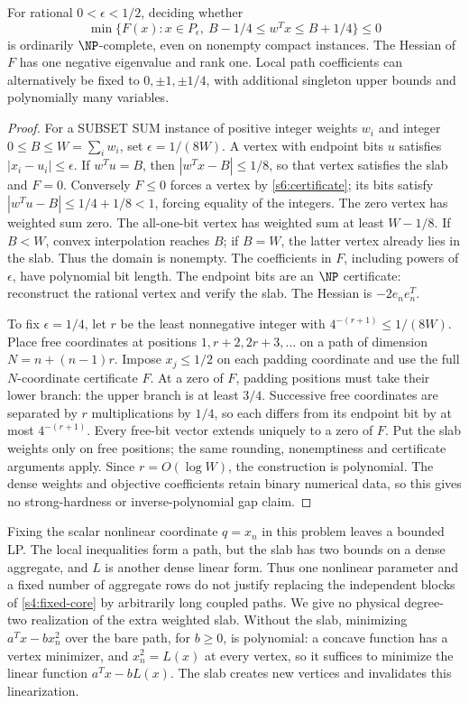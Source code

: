 \begin{proposition}\label{s6:slab-hardness}
For rational $0<\epsilon<1/2$, deciding whether
\[
 \min\{F(x):x\in P_\epsilon,\ B-1/4\le w^Tx\le B+1/4\}\le0
\]
is ordinarily $\NP$-complete, even on nonempty compact instances.
The Hessian of $F$ has one negative eigenvalue and rank one. Local
path coefficients can alternatively be fixed to $0,\pm1,\pm1/4$,
with additional singleton upper bounds and polynomially many variables.
\end{proposition}
\begin{proof}
For a SUBSET SUM instance of positive integer weights $w_i$ and integer
$0\le B\le W=\sum_iw_i$, set $\epsilon=1/(8W)$. A vertex with
endpoint bits $u$ satisfies $|x_i-u_i|\le\epsilon$.
If $w^Tu=B$, then $|w^Tx-B|\le1/8$, so that vertex satisfies the
slab and $F=0$. Conversely $F\le0$ forces a vertex by
\cref{s6:certificate}; its bits satisfy
$|w^Tu-B|\le1/4+1/8<1$, forcing equality of the integers.
The zero vertex has weighted sum zero. The all-one-bit vertex has
weighted sum at least $W-1/8$. If $B<W$, convex interpolation reaches
$B$; if $B=W$, the latter vertex already lies in the slab.
Thus the domain is nonempty. The coefficients in $F$, including powers
of $\epsilon$, have polynomial bit length. The endpoint bits are an
$\NP$ certificate: reconstruct the rational vertex and verify the slab.
The Hessian is $-2e_ne_n^T$.

To fix $\epsilon=1/4$, let $r$ be the least nonnegative integer with
$4^{-(r+1)}\le1/(8W)$. Place free coordinates at positions
$1,r+2,2r+3,\ldots$ on a path of dimension $N=n+(n-1)r$.
Impose $x_j\le1/2$ on each padding coordinate and use the full
$N$-coordinate certificate $F$. At a zero of $F$, padding positions
must take their lower branch: the upper branch is at least $3/4$.
Successive free coordinates are separated by $r$ multiplications by
$1/4$, so each differs from its endpoint bit by at most $4^{-(r+1)}$.
Every free-bit vector extends uniquely to a zero of $F$. Put the slab
weights only on free positions; the same rounding, nonemptiness and
certificate arguments apply. Since $r=O(\log W)$, the construction is polynomial.
The dense weights and objective coefficients retain binary numerical
data, so this gives no strong-hardness or inverse-polynomial gap claim.
\end{proof}

Fixing the scalar nonlinear coordinate $q=x_n$ in this problem leaves
a bounded LP. The local inequalities form a path, but the slab has two
bounds on a dense aggregate, and $L$ is another dense linear form.
Thus one nonlinear parameter and a fixed number of aggregate rows do
not justify replacing the independent blocks of \cref{s4:fixed-core}
by arbitrarily long coupled paths. We give no physical degree-two realization
of the extra weighted slab. Without the slab,
minimizing $a^Tx-bx_n^2$ over the bare path, for $b\ge0$, is polynomial:
a concave function has a vertex minimizer, and $x_n^2=L(x)$ at every
vertex, so it suffices to minimize the linear function $a^Tx-bL(x)$. The slab
creates new vertices and invalidates this linearization.

